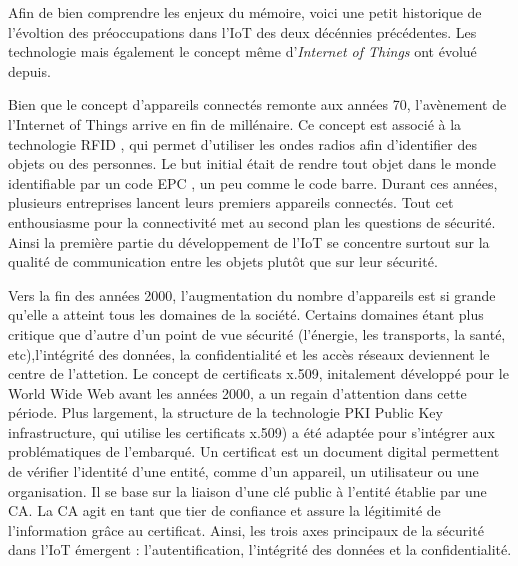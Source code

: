 \vspace{0.1cm}

Afin de bien comprendre les enjeux du mémoire, voici une petit historique de l'évoltion des préoccupations dans l'\ac{IoT} des deux décénnies précédentes. Les technologie mais également le concept même d'\textit{Internet of Things} ont évolué depuis.

\vspace{0.1cm}

Bien que le concept d'appareils connectés remonte aux années 70, l'avène\-ment de l'Internet of Things arrive en fin de millénaire. Ce concept est associé à la technologie \ac{RFID} \cite{RFID}, qui permet d'utiliser les ondes radios afin d'identifier des objets ou des personnes. Le but initial était de rendre tout objet dans le monde identifiable par un code \ac{EPC} \cite{EPC}, un peu comme le code barre. Durant ces années, plusieurs entreprises lancent leurs premiers appareils connectés. Tout cet enthousiasme pour la connectivité met au second plan les questions de sécurité. Ainsi la première partie du développement de l'\ac{IoT} se concentre surtout sur la qualité de communication entre les objets plutôt que sur leur sécurité.

\vspace{0.1cm}

Vers la fin des années 2000, l'augmentation du nombre d'appareils est si grande qu'elle a atteint tous les domaines de la société. Certains domaines étant plus critique que d'autre d'un point de vue sécurité (l'énergie, les transports, la santé, etc),l'intégrité des données, la confidentialité et les accès réseaux deviennent le centre de l'attetion. 
Le concept de certificats x.509, initalement dévelop\-pé pour le World Wide Web avant les années 2000, a un regain d'attention dans cette période. Plus largement, la structure de la technologie \ac{PKI} Public Key infrastructure, qui utilise les certificats x.509) \cite{PKI} a été adaptée pour s'intégrer aux problématiques de l'embarqué. Un certificat est un document digital permettent de vérifier l'identité d'une entité, comme d'un appareil, un utilisateur ou une organisation. Il se base sur la liaison d'une clé public à l'entité établie par une \ac{CA}. La CA agit en tant que tier de confiance et assure la légitimité de l'information grâce au certificat. Ainsi, les trois axes principaux de la sécurité dans l'\ac{IoT} émergent : l'autentification, l'intégrité des données et la confidentialité.

\vspace{0.1cm}


